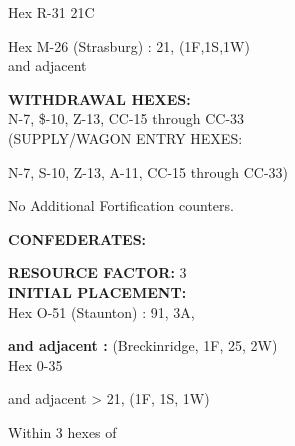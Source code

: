 \begin{scenariodata}
Hex R-31 21C\\
\end{scenariodata}

\begin{scenariodata}
Hex M-26 (Strasburg) : 21, (1F,1S,1W)\\
and adjacent\\
\end{scenariodata}

\begin{scenariodata}
\textbf{WITHDRAWAL HEXES:}\\
N-7, \$-10, Z-13, CC-15 through CC-33\\
(SUPPLY/WAGON ENTRY HEXES:\\
\end{scenariodata}

\begin{scenariodata}
N-7, S-10, Z-13, A-11, CC-15 through CC-33)\\
\end{scenariodata}

\begin{scenariodata}
No Additional Fortification counters.\\
\end{scenariodata}

\begin{scenariodata}
\textbf{CONFEDERATES:}\\
\end{scenariodata}

\begin{scenariodata}
\textbf{RESOURCE FACTOR:} 3\\
\textbf{INITIAL PLACEMENT:}\\
Hex O-51 (Staunton) : 91, 3A,\\
\end{scenariodata}

\begin{scenariodata}
\textbf{and adjacent :} (Breckinridge, 1F, 25, 2W)\\
Hex 0-35\\
\end{scenariodata}

\begin{scenariodata}
and adjacent > 21, (1F, 1S, 1W)\\
\end{scenariodata}

\begin{scenariodata}
Within 3 hexes of\\
\end{scenariodata}

